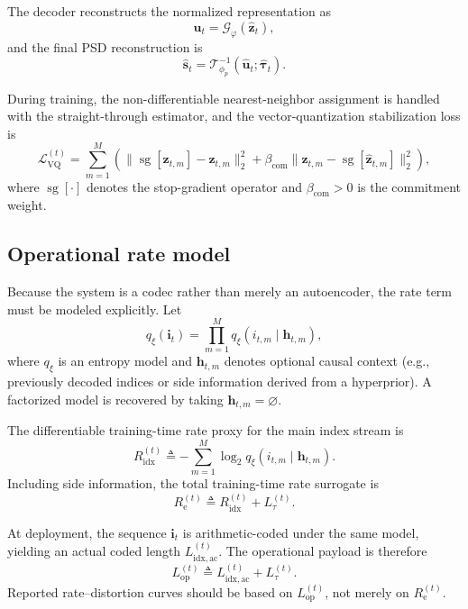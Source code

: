 \documentclass[11pt]{article}
\begin{document}
The decoder reconstructs the normalized representation as
\begin{equation}
\hat{\mathbf{u}}_t
=
\mathcal{G}_{\varphi}(\hat{\mathbf{z}}_t),
\end{equation}
and the final PSD reconstruction is
\begin{equation}
\hat{\mathbf{s}}_t
=
\mathcal{T}_{\phi_p}^{-1}(\hat{\mathbf{u}}_t;\hat{\boldsymbol{\tau}}_t).
\end{equation}

During training, the non-differentiable nearest-neighbor assignment is handled with the
straight-through estimator, and the vector-quantization stabilization loss is
\begin{equation}
\mathcal{L}_{\mathrm{VQ}}^{(t)}
=
\sum_{m=1}^{M}
\left(
\big\|
\operatorname{sg}[\mathbf{z}_{t,m}] - \hat{\mathbf{z}}_{t,m}
\big\|_2^2
+
\beta_{\mathrm{com}}
\big\|
\mathbf{z}_{t,m} - \operatorname{sg}[\hat{\mathbf{z}}_{t,m}]
\big\|_2^2
\right),
\end{equation}
where $\operatorname{sg}[\cdot]$ denotes the stop-gradient operator and
$\beta_{\mathrm{com}} > 0$ is the commitment weight.

\subsection{Operational rate model}
Because the system is a codec rather than merely an autoencoder, the rate term must be modeled
explicitly. Let
\begin{equation}
q_{\xi}(\mathbf{i}_t)
=
\prod_{m=1}^{M}
q_{\xi}(i_{t,m}\mid \mathbf{h}_{t,m}),
\end{equation}
where $q_{\xi}$ is an entropy model and $\mathbf{h}_{t,m}$ denotes optional causal context
(e.g., previously decoded indices or side information derived from a hyperprior). A factorized model
is recovered by taking $\mathbf{h}_{t,m}=\varnothing$.

The differentiable training-time rate proxy for the main index stream is
\begin{equation}
R_{\mathrm{idx}}^{(t)}
\triangleq
-\sum_{m=1}^{M}
\log_{2} q_{\xi}(i_{t,m}\mid \mathbf{h}_{t,m}).
\end{equation}
Including side information, the total training-time rate surrogate is
\begin{equation}
R_{\mathrm{e}}^{(t)}
\triangleq
R_{\mathrm{idx}}^{(t)} + L_{\tau}^{(t)}.
\end{equation}

At deployment, the sequence $\mathbf{i}_t$ is arithmetic-coded under the same model, yielding an
actual coded length $L_{\mathrm{idx},\mathrm{ac}}^{(t)}$. The operational payload is therefore
\begin{equation}
L_{\mathrm{op}}^{(t)}
\triangleq
L_{\mathrm{idx},\mathrm{ac}}^{(t)} + L_{\tau}^{(t)}.
\end{equation}
Reported rate--distortion curves should be based on $L_{\mathrm{op}}^{(t)}$, not merely on
$R_{\mathrm{e}}^{(t)}$.
\end{document}

